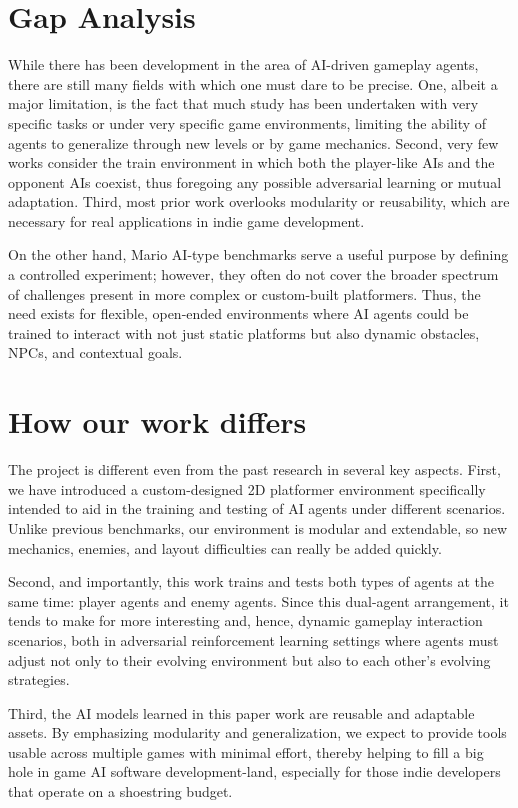 \documentclass[12pt,oneside,openright,a4paper]{cpe-english-project}
\begin{document}
\section{Gap Analysis}
While there has been development in the area of AI-driven gameplay agents, there are still many fields with which one must dare to be precise. One, albeit a major limitation, is the fact that much study has been undertaken with very specific tasks or under very specific game environments, limiting the ability of agents to generalize through new levels or by game mechanics. Second, very few works consider the train environment in which both the player-like AIs and the opponent AIs coexist, thus foregoing any possible adversarial learning or mutual adaptation. Third, most prior work overlooks modularity or reusability, which are necessary for real applications in indie game development.\par

On the other hand, Mario AI-type benchmarks serve a useful purpose by defining a controlled experiment; however, they often do not cover the broader spectrum of challenges present in more complex or custom-built platformers. Thus, the need exists for flexible, open-ended environments where AI agents could be trained to interact with not just static platforms but also dynamic obstacles, NPCs, and contextual goals.\par
\section{How our work differs}
The project is different even from the past research in several key aspects. First, we have introduced a custom-designed 2D platformer environment specifically intended to aid in the training and testing of AI agents under different scenarios. Unlike previous benchmarks, our environment is modular and extendable, so new mechanics, enemies, and layout difficulties can really be added quickly.\par

Second, and importantly, this work trains and tests both types of agents at the same time: player agents and enemy agents. Since this dual-agent arrangement, it tends to make for more interesting and, hence, dynamic gameplay interaction scenarios, both in adversarial reinforcement learning settings where agents must adjust not only to their evolving environment but also to each other's evolving strategies.\par

Third, the AI models learned in this paper work are reusable and adaptable assets. By emphasizing modularity and generalization, we expect to provide tools usable across multiple games with minimal effort, thereby helping to fill a big hole in game AI software development-land, especially for those indie developers that operate on a shoestring budget.\par
\end{document}
